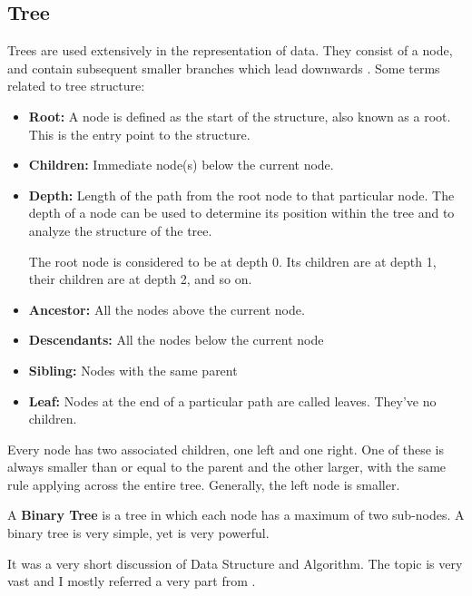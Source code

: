 \subsection*{Tree}
 Trees are used extensively in the representation of data. They consist of a node, and contain subsequent smaller branches which lead downwards \cite{antunes_time_complexity}. 
\vspace{4mm}
\noindent Some terms related to tree structure:
\begin{itemize}
    \item \textbf{Root:} A node is defined as the start of the structure, also known as a root. This is the entry point to the structure.
    \item \textbf{Children:} Immediate node(s) below the current node.
    \item \textbf{Depth:} Length of the path from the root node to that particular node. The depth of a node can be used to determine its position within the tree and to analyze the structure of the tree.
\begin{example}
The root node is considered to be at depth 0. Its children are at depth 1, their children are at depth 2, and so on. 
\end{example}
    \item \textbf{Ancestor:} All the nodes above the current node.
    \item \textbf{Descendants:} All the nodes below the current node
    \item \textbf{Sibling:} Nodes with the same parent
    \item \textbf{Leaf:} Nodes at the end of a particular path are called leaves. They've no children.
\end{itemize}

 Every node has two associated children, one left and one right. One of these is always smaller than or equal to the parent and the other larger, with the same rule applying across the entire tree. Generally, the left node is smaller.


A \textbf{Binary Tree} is a tree in which each node has a maximum of two sub-nodes. A binary tree is very simple, yet is very powerful.


It was a very short discussion of Data Structure and Algorithm. The topic is very vast and I mostly referred a very part from \cite{bds,fox}.
